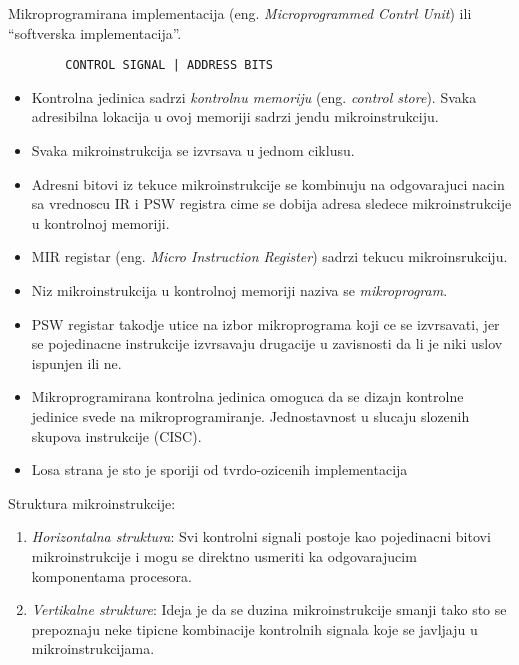 \documentclass[12p,a4paper]{article}
\begin{document}
\begin{multicols}{2}
    Mikroprogramirana implementacija (eng. \emph{Microprogrammed Contrl Unit})
    ili ``softverska implementacija''.
    \begin{lstlisting}
        CONTROL SIGNAL | ADDRESS BITS
    \end{lstlisting}
    \begin{itemize}
        \itemsep0em
        \item Kontrolna jedinica sadrzi \emph{kontrolnu memoriju} 
            (eng. \emph{control store}). Svaka adresibilna lokacija u ovoj
            memoriji sadrzi jendu mikroinstrukciju.
        \item Svaka mikroinstrukcija se izvrsava u jednom ciklusu.
        \item Adresni bitovi iz tekuce mikroinstrukcije se kombinuju na 
            odgovarajuci nacin sa vrednoscu IR i PSW registra cime se dobija 
            adresa sledece mikroinstrukcije u kontrolnoj memoriji.
        \item MIR registar (eng. \emph{Micro Instruction Register}) sadrzi
            tekucu mikroinsrukciju.
        \item Niz mikroinstrukcija u kontrolnoj memoriji naziva se
            \emph{mikroprogram}. 
        \item PSW registar takodje utice na izbor mikroprograma koji ce se
            izvrsavati, jer se pojedinacne instrukcije izvrsavaju drugacije 
            u zavisnosti da li je niki uslov ispunjen ili ne.
        \item Mikroprogramirana kontrolna jedinica omoguca da se dizajn 
            kontrolne jedinice svede na mikroprogramiranje. Jednostavnost u
            slucaju slozenih skupova instrukcije (CISC).
        \item Losa strana je sto je sporiji od tvrdo-ozicenih implementacija
    \end{itemize}

    Struktura mikroinstrukcije:
    \begin{enumerate}
        \itemsep0em
        \item \emph{Horizontalna struktura}: Svi kontrolni signali postoje
            kao pojedinacni bitovi mikroinstrukcije i mogu se direktno
            usmeriti ka odgovarajucim komponentama procesora.
        \item \emph{Vertikalne strukture}: Ideja je da se duzina 
            mikroinstrukcije smanji tako sto se prepoznaju neke tipicne
            kombinacije kontrolnih signala koje se javljaju u 
            mikroinstrukcijama.
    \end{enumerate}


\end{multicols}
\end{document}
